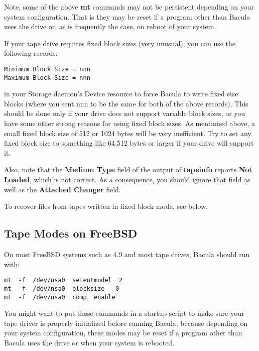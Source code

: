 Note, some of the above {\bf mt} commands may not be persistent depending
on your system configuration. That is they may be reset if a program  
other than Bacula uses the drive or, as is frequently the case, on reboot
of your system.
                   
If your tape drive requires fixed block sizes (very unusual), you can use the
following records: 

\footnotesize
\begin{verbatim}
Minimum Block Size = nnn
Maximum Block Size = nnn
\end{verbatim}
\normalsize

in your Storage daemon's Device resource to force Bacula to write fixed size
blocks (where you sent nnn to be the same for both of the above records). This
should be done only if your drive does not support variable block sizes, or
you have some other strong reasons for using fixed block sizes. As mentioned
above, a small fixed block size of 512 or 1024 bytes will be very inefficient.
Try to set any fixed block size to something like 64,512 bytes or larger if
your drive will support it. 

Also, note that the {\bf Medium Type} field of the output of {\bf tapeinfo}
reports {\bf Not Loaded}, which is not correct. As a consequence, you should
ignore that field as well as the {\bf Attached Changer} field. 

To recover files from tapes written in fixed block mode, see below. 
\label{FreeBSDTapes}

\subsection{Tape Modes on FreeBSD}

On most FreeBSD systems such as 4.9 and most tape drives, Bacula should run
with: 

\footnotesize
\begin{verbatim}
mt  -f  /dev/nsa0  seteotmodel  2
mt  -f  /dev/nsa0  blocksize   0
mt  -f  /dev/nsa0  comp  enable
\end{verbatim}
\normalsize

You might want to put those commands in a startup script to make sure your
tape driver is properly initialized before running Bacula, because
depending on your system configuration, these modes may be reset if a      
program other than Bacula uses the drive or when your system is rebooted.

